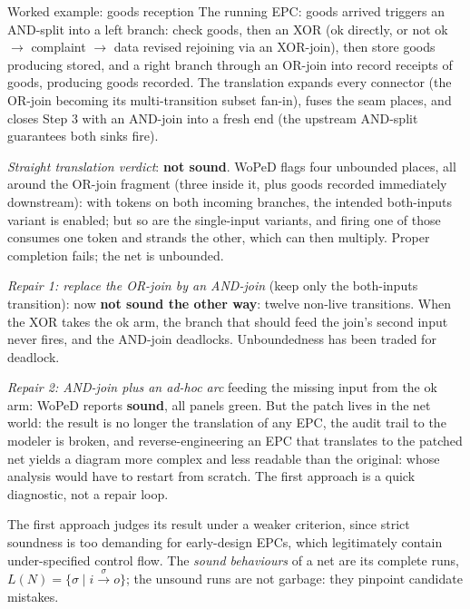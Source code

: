 \begin{examplebox}{Worked example: goods reception}
The running EPC: \textsf{goods arrived} triggers an AND-split into a left branch: \textsf{check goods}, then an XOR (\textsf{ok} directly, or \textsf{not ok} $\to$ \textsf{complaint} $\to$ \textsf{data revised} rejoining via an XOR-join), then \textsf{store goods} producing \textsf{stored}, and a right branch through an OR-join into \textsf{record receipts of goods}, producing \textsf{goods recorded}. The translation expands every connector (the OR-join becoming its multi-transition subset fan-in), fuses the seam places, and closes Step 3 with an AND-join into a fresh \textsf{end} (the upstream AND-split guarantees both sinks fire).
\par\smallskip
\emph{Straight translation verdict}: \textbf{not sound}. WoPeD flags four unbounded places, all around the OR-join fragment (three inside it, plus \textsf{goods recorded} immediately downstream): with tokens on both incoming branches, the intended both-inputs variant is enabled; but so are the single-input variants, and firing one of those consumes one token and strands the other, which can then multiply. Proper completion fails; the net is unbounded.
\par\smallskip
\emph{Repair 1: replace the OR-join by an AND-join} (keep only the both-inputs transition): now \textbf{not sound the other way}: twelve non-live transitions. When the XOR takes the \textsf{ok} arm, the branch that should feed the join's second input never fires, and the AND-join deadlocks. Unboundedness has been traded for deadlock.
\par\smallskip
\emph{Repair 2: AND-join plus an ad-hoc arc} feeding the missing input from the \textsf{ok} arm: WoPeD reports \textbf{sound}, all panels green. But the patch lives in the net world: the result is no longer the translation of any EPC, the audit trail to the modeler is broken, and reverse-engineering an EPC that translates to the patched net yields a diagram more complex and less readable than the original: whose analysis would have to restart from scratch. The first approach is a quick diagnostic, not a repair loop.
\end{examplebox}

The first approach judges its result under a weaker criterion, since strict soundness is too demanding for early-design EPCs, which legitimately contain under-specified control flow. The \emph{sound behaviours} of a net are its complete runs, $L(N) = \{\sigma \mid i \xrightarrow{\sigma} o\}$; the unsound runs are not garbage: they pinpoint candidate mistakes.

